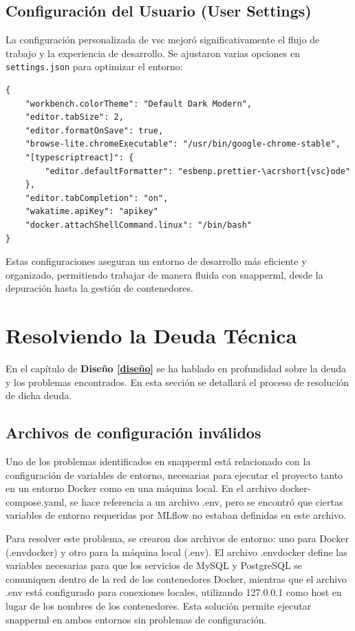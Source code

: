 \subsection{Configuración del Usuario (User Settings)}

La configuración personalizada de \acrlong{vsc} mejoró significativamente el flujo de trabajo y la experiencia de desarrollo. Se ajustaron varias opciones en \texttt{settings.json} para optimizar el entorno:

\begin{verbatim} 
{ 
    "workbench.colorTheme": "Default Dark Modern",
    "editor.tabSize": 2,
    "editor.formatOnSave": true,
    "browse-lite.chromeExecutable": "/usr/bin/google-chrome-stable",
    "[typescriptreact]": {
        "editor.defaultFormatter": "esbenp.prettier-\acrshort{vsc}ode"
    },
    "editor.tabCompletion": "on",
    "wakatime.apiKey": "apikey"
    "docker.attachShellCommand.linux": "/bin/bash" 
} 
\end{verbatim}

Estas configuraciones aseguran un entorno de desarrollo más eficiente y organizado, permitiendo trabajar de manera fluida con \Gls{snapperml}, desde la depuración hasta la gestión de contenedores.

\section{Resolviendo la Deuda Técnica}
En el capítulo de \textbf{Diseño \ref{diseño}} se ha hablado en profundidad sobre la \gls{deuda} y los problemas encontrados. En esta sección se detallará el proceso de resolución de dicha deuda.

\subsection{Archivos de configuración inválidos}
Uno de los problemas identificados en \Gls{snapperml} está relacionado con la configuración de variables de entorno, necesarias para ejecutar el proyecto tanto en un entorno Docker como en una máquina local. En el archivo docker-compose.yaml, se hace referencia a un archivo .env, pero se encontró que ciertas variables de entorno requeridas por MLflow no estaban definidas en este archivo.

\vspace{2.5mm}

Para resolver este problema, se crearon dos archivos de entorno: uno para Docker (.envdocker) y otro para la máquina local (.env). El archivo .envdocker define las variables necesarias para que los servicios de MySQL y PostgreSQL se comuniquen dentro de la red de los contenedores Docker, mientras que el archivo .env está configurado para conexiones locales, utilizando 127.0.0.1 como host en lugar de los nombres de los contenedores. Esta solución permite ejecutar \Gls{snapperml} en ambos entornos sin problemas de configuración.

